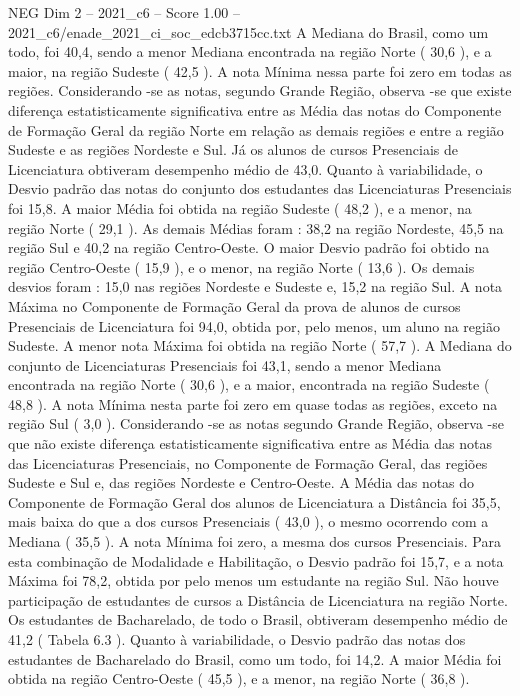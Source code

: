 \begin{textsample}{NEG Dim 2 – 2021\_c6 – Score 1.00 – 2021\_c6/enade\_2021\_ci\_soc\_edcb3715cc.txt}
A Mediana do Brasil, como um todo, foi 40,4, sendo a menor Mediana encontrada na região Norte ( 30,6 ), e a maior, na região Sudeste ( 42,5 ).
A nota Mínima nessa parte foi zero em todas as regiões.
Considerando -se as notas, segundo Grande Região, observa -se que existe diferença estatisticamente significativa entre as Média das notas do Componente de Formação Geral da região Norte em relação as demais regiões e entre a região Sudeste e as regiões Nordeste e Sul.
Já os alunos de cursos Presenciais de Licenciatura obtiveram desempenho médio de 43,0.
Quanto à variabilidade, o Desvio padrão das notas do conjunto dos estudantes das Licenciaturas Presenciais foi 15,8.
A maior Média foi obtida na região Sudeste ( 48,2 ), e a menor, na região Norte ( 29,1 ).
As demais Médias foram : 38,2 na região Nordeste, 45,5 na região Sul e 40,2 na região Centro-Oeste.
O maior Desvio padrão foi obtido na região Centro-Oeste ( 15,9 ), e o menor, na região Norte ( 13,6 ).
Os demais desvios foram : 15,0 nas regiões Nordeste e Sudeste e, 15,2 na região Sul.
A nota Máxima no Componente de Formação Geral da prova de alunos de cursos Presenciais de Licenciatura foi 94,0, obtida por, pelo menos, um aluno na região Sudeste.
A menor nota Máxima foi obtida na região Norte ( 57,7 ).
A Mediana do conjunto de Licenciaturas Presenciais foi 43,1, sendo a menor Mediana encontrada na região Norte ( 30,6 ), e a maior, encontrada na região Sudeste ( 48,8 ).
A nota Mínima nesta parte foi zero em quase todas as regiões, exceto na região Sul ( 3,0 ).
Considerando -se as notas segundo Grande Região, observa -se que não existe diferença estatisticamente significativa entre as Média das notas das Licenciaturas Presenciais, no Componente de Formação Geral, das regiões Sudeste e Sul e, das regiões Nordeste e Centro-Oeste.
A Média das notas do Componente de Formação Geral dos alunos de Licenciatura a Distância foi 35,5, mais baixa do que a dos cursos Presenciais ( 43,0 ), o mesmo ocorrendo com a Mediana ( 35,5 ).
A nota Mínima foi zero, a mesma dos cursos Presenciais.
Para esta combinação de Modalidade e Habilitação, o Desvio padrão foi 15,7, e a nota Máxima foi 78,2, obtida por pelo menos um estudante na região Sul.
Não houve participação de estudantes de cursos a Distância de Licenciatura na região Norte.
Os estudantes de Bacharelado, de todo o Brasil, obtiveram desempenho médio de 41,2 ( Tabela 6.3 ).
Quanto à variabilidade, o Desvio padrão das notas dos estudantes de Bacharelado do Brasil, como um todo, foi 14,2.
A maior Média foi obtida na região Centro-Oeste ( 45,5 ), e a menor, na região Norte ( 36,8 ).

\end{textsample}
